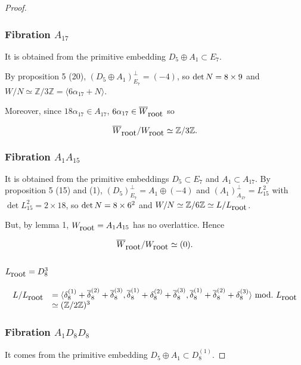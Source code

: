 \documentclass{amsart}
\begin{document}
\begin{proof}
\subsubsection{Fibration $A_{17}$}
It is obtained from the primitive embedding $D_5\oplus A_1 \subset E_7$.

By proposition 5 (20), $(D_5\oplus A_1)_{E_7}^{\perp}=(-4)$, so $\hbox{det}\,N=8\times 9$ and $W/N \simeq \mathbb Z/3 \mathbb Z=\langle 6\alpha_{17} +N \rangle$.

Moreover, since $18\alpha_{17}\in A_{17}$, $6\alpha_{17}\in \overline{W}_{\hbox{root}}$ so

$$\overline{W}_{\hbox{root}}/W_{\hbox{root}}\simeq \mathbb Z /3\mathbb Z.$$

\subsubsection{Fibration $A_1A_{15}$}
It is obtained from the primitive embeddings $D_5 \subset E_7$ and $A_1 \subset A_{17}$.
By proposition 5 (15) and (1), $(D_5)_{E_7}^{\perp}=A_1\oplus (-4)$ and $(A_1)_{A_{17}}^{\perp}=L_{15}^2$ with $\det L_{15}^2=2\times 18$, so $\hbox{det}\,N=8\times 6^2$ and $W/N\simeq \mathbb Z/6 \mathbb Z \simeq L/L_{\hbox{root}}$.

But, by lemma 1, $W_{\hbox{root}}=A_1A_{15}$ has no overlattice. Hence

$$\overline{W}_{\hbox{root}}/W_{\hbox{root}}\simeq (0).$$




\subsection{$L_{\hbox{root}}=D_8^3$}

$$
\begin{array}{ll}
L/L_{\hbox{root}} & =\langle \delta_8^{(1)}+\overline {\delta}_8^{(2)}+\overline{\delta}_8^{(3)}, \overline{\delta}_8^{(1)}+ {\delta}_8^{(2)}+\overline{\delta}_8^{(3)},\overline{ \delta}_8^{(1)}+\overline {\delta}_8^{(2)}+{\delta}_8^{(3)}\rangle\,\, \hbox{mod.}\,\, L_{\hbox{root}}\\
       &   \simeq (\mathbb Z/2 \mathbb Z)^3
\end{array}
$$


\subsubsection{ Fibration $A_1 D_8 D_8$}

It comes from the primitive embedding $D_5\oplus A_1 \subset D_8^{(1)}$.


\end{proof}
\end{document}
